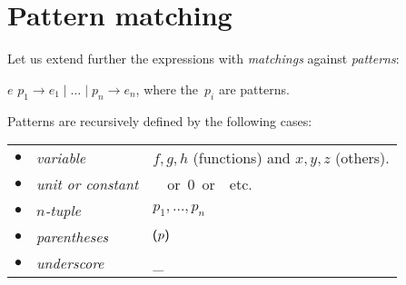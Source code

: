 \bigskip

\noindent{}

\noindent{}

\noindent{}




\section{Pattern matching}

Let us extend further the expressions with \emph{matchings} against
\emph{patterns}:
\begin{center}
  \Xmatch{} $e$ \Xwith{} $p_1 \rightarrow e_1 \mid \ldots \mid
    p_n \rightarrow e_n$, where the~$p_i$ are patterns.
\end{center}

\noindent Patterns are recursively defined by the following cases:

\bigskip

\begin{tabular}{rll}
    $\bullet$
  & \emph{variable}
  & $f, g, h$ (functions) and $x, y, z$ (others). \\
    $\bullet$
  & \emph{unit or constant}
  & \unit \ or \textsf{0} or \Xtrue{} etc.\\
    $\bullet$
  & \emph{$n$-tuple}
  & $p_1, \ldots, p_n$\\
    $\bullet$
  & \emph{parentheses}
  & $\textsf{(}{p}\textsf{)}$\\
    $\bullet$
  & \emph{underscore}
  & {\Large \_}
\end{tabular}

\bigskip

